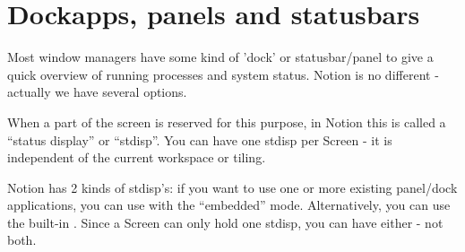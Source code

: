 \section{Dockapps, panels and statusbars}

Most window managers have some kind of 'dock' or statusbar/panel to give a 
quick overview of running processes and system status. Notion is no 
different - actually we have several options.

When a part of the screen is reserved for this purpose, in Notion this is 
called a ``status display'' or ``stdisp''. You can have one stdisp per Screen 
- it is independent of the current workspace or tiling.

Notion has 2 kinds of stdisp's: if you want to use one or more existing 
panel/dock applications, you can use  with the ``embedded'' 
mode.  Alternatively, you can use the built-in . Since a 
Screen can only hold one stdisp, you can have either - not both.




